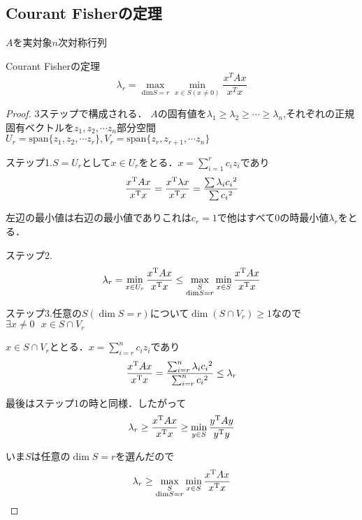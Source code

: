 \subsection{Courant Fisherの定理}
$A$を実対象$n$次対称行列
\begin{itembox}[l]{Courant Fisherの定理}
  \begin{equation}
      \lambda_r = \max_{\mathrm{dim}S = r}
      \min_{x\in S (x\neq 0)}\frac{x^TAx}{x^Tx}
  \end{equation}
\end{itembox}
\begin{proof}
3ステップで構成される．
$A$の固有値を${\lambda}_1 \geq {\lambda}_2 \geq \cdots \geq {\lambda}_n$,それぞれの正規固有ベクトルを$z_1 ,z_2 ,\cdots z_n$部分空間$U_r ={\mathrm{span}}\{ z_1 ,z_2 ,\cdots z_r\},V_r = {\mathrm{span}}\{ z_r ,z_{r+1},\cdots z_n\}$

ステップ1.$S=U_r$として$x\in U_r$をとる．$x=\displaystyle\sum_{i=1}^r c_i z_i$であり
\begin{equation*}
  \displaystyle\frac{{x}^{\mathrm{T}}Ax}{{x}^{\mathrm{T}}x}=\frac{{x}^{\mathrm{T}}\lambda x}{{x}^{\mathrm{T}}x}=\frac{\sum {\lambda}_i {c_i}^2}{\sum {c_i}^2}
\end{equation*}

左辺の最小値は右辺の最小値でありこれは$c_r =1$で他はすべて0の時最小値${\lambda}_r$をとる．

ステップ2.
\begin{equation*}
  {\lambda}_r =\min_{x\in U_r}\displaystyle\frac{{x}^{\mathrm{T}}Ax}{{x}^{\mathrm{T}}x}\leq 
  \max_{\substack{S\\ \text{dim}S=r}}\min_{x\in S}\frac{{x}^{\mathrm{T}}Ax}{{x}^{\mathrm{T}}x}
\end{equation*}

ステップ3.任意の$S(\dim S=r)$について$\dim (S\cap V_r )\geq 1$なので$\exists x\neq 0\ \ \ x\in S\cap V_r$

$x\in S\cap V_r$ととる．$x=\displaystyle\sum_{i=r}^n c_i z_i$であり
\begin{equation*}
  \displaystyle\frac{{x}^{\mathrm{T}}Ax}{{x}^{\mathrm{T}}x}=\frac{\sum_{i=r}^n {\lambda}_i {c_i}^2}{\sum_{i=r}^n {c_i}^2}\leq {\lambda}_r
\end{equation*}

最後はステップ1の時と同様．したがって
\begin{equation*}
  {\lambda}_r \geq \displaystyle\frac{{x}^{\mathrm{T}}Ax}{{x}^{\mathrm{T}}x}\geq \min_{y\in S}\frac{{y}^{\mathrm{T}}Ay}{{y}^{\mathrm{T}}y}
\end{equation*}

いま$S$は任意の$\dim S=r$を選んだので
\begin{equation}
    {\lambda}_r \geq \max_{\substack{S\\ \text{dim}S=r}}\min_{x\in S}\frac{{x}^{\mathrm{T}}Ax}{{x}^{\mathrm{T}}x}
\end{equation}
\end{proof}
